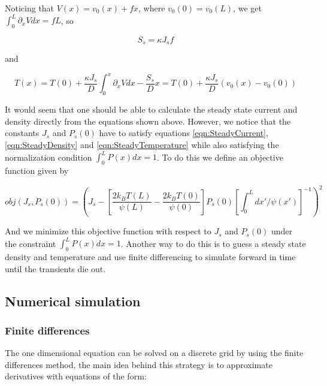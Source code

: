\documentclass[11pt]{article} %
\begin{document}
Noticing that $V(x) = v_0(x) + f x$, where $v_0(0) = v_0(L)$, we get $\int_0^L \partial_x V dx = f L$, so

\begin{equation}
S_s = \kappa J_s f
\end{equation}

and

\begin{equation}
T(x) = T(0) + \frac{\kappa J_s}{D} \int_0^x \partial_x V dx - \frac{S_s}{D}x = T(0) + \frac{\kappa J_s}{D} (v_0(x) - v_0(0)) \label{eqn:SteadyTemperature}
\end{equation}

It would seem that one should be able to calculate the steady state current and density directly from the equations shown above. However, we notice that the constants $J_s$ and $P_s(0)$ have to satisfy equations \ref{eqn:SteadyCurrent}, \ref{eqn:SteadyDensity} and \ref{eqn:SteadyTemperature} while also satisfying the normalization condition $\int_0^L P(x) dx = 1$. To do this we define an objective function given by

\begin{equation}
obj(J_s, P_s(0)) = \left (J_s - \left [\frac{2 k_B T(L)}{\psi(L)} - \frac{2 k_B T(0)}{\psi(0)}  \right] P_s(0) \left [\int_0^L dx'/\psi(x') \right]^{-1} \right)^2  \label{eqn:Objective}
\end{equation}

And we minimize this objective function with respect to $J_s$ and $P_s(0)$ under the constraint $\int_0^L P(x) dx = 1$. Another way to do this is to guess a steady state density and temperature and use finite differencing to simulate forward in time until the transients die out.


\subsection{Numerical simulation} \label{numerics}

\subsubsection{Finite differences}
The one dimensional equation can be solved on a discrete grid by using the finite differences method, the main idea behind this strategy is to approximate derivatives with equations of the form:
\end{document}
